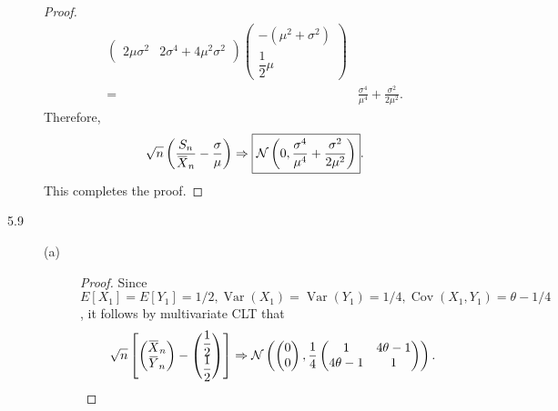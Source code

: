 \documentclass{article}
\newcommand{\overbar}[1]{\mkern 1.5mu\overline{\mkern-1.5mu#1\mkern-1.5mu}\mkern 1.5mu}
\newcommand{\gaussian}{\mathcal{N}}
\DeclareMathOperator*{\Var}{Var}
\DeclareMathOperator*{\Cov}{Cov}
\theoremstyle{definition}
\theoremstyle{plain}
\theoremstyle{remark}
\begin{document}
\begin{description}
\begin{proof}
\begin{align*}
\begin{pmatrix}
2\mu\sigma^2 & 2\sigma^4 + 4\mu^2\sigma^2 \end{pmatrix} \begin{pmatrix}-(\mu^2 + \sigma^2) \\ \dfrac{1}{2}\mu \end{pmatrix} \\
= & \frac{\sigma^4}{\mu^4} + \frac{\sigma^2}{2\mu^2}.
\end{align*}
Therefore,
\begin{equation*}
\sqrt{n}\left(\frac{S_n}{\overbar{X}_n} - \frac{\sigma}{\mu}\right) \Rightarrow \boxed{\gaussian\left(0, \frac{\sigma^4}{\mu^4} + \frac{\sigma^2}{2\mu^2}\right)}.
\end{equation*}
This completes the proof.
\end{proof}

\item[5.9]
\begin{description}
\item[(a)]
\begin{proof}
Since $E[X_1] = E[Y_1] = 1/2, \Var(X_1) = \Var(Y_1) = 1/4, \Cov(X_1, Y_1) = \theta - 1/4$, it follows by multivariate CLT that
\begin{equation*}
\sqrt{n}\left[\begin{pmatrix} \overbar{X}_n \\ \overbar{Y}_n \end{pmatrix} - \begin{pmatrix} \dfrac{1}{2} \\ \dfrac{1}{2} \end{pmatrix}\right] \Rightarrow 
\gaussian\left(\begin{pmatrix} 0 \\ 0 \end{pmatrix}, \dfrac{1}{4}\begin{pmatrix} 1 & 4\theta - 1 \\
4\theta - 1 & 1 \end{pmatrix}\right).
\end{equation*}
\end{proof}


\end{description}
\end{description}
\end{document}
